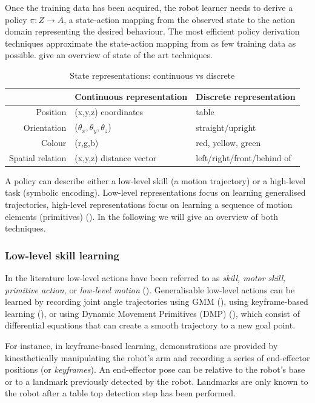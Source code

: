 Once the training data has been acquired, the robot learner needs to derive a policy $\pi : Z \rightarrow A$, a state-action mapping from the observed state to the action domain representing the desired behaviour.
The most efficient policy derivation techniques approximate the state-action mapping from as few training data as possible.
\cite{chernova2014robot} give an overview of state of the art techniques.

\begin{table}[ht]
	\centering
	\caption{State representations: continuous vs discrete}
	\label{tab:representations}
	\begin{tabular}{r|ll}
		& Continuous representation & Discrete representation\\ \hline
		Position & (x,y,z) coordinates & table \\
		Orientation & ($\theta_x,\theta_y,\theta_z$) & straight/upright \\
		Colour & (r,g,b) & red, yellow, green\\
		Spatial relation & (x,y,z) distance vector & left/right/front/behind of 
	\end{tabular}
\end{table}

A policy can describe either a low-level skill (\ie a motion trajectory) or a high-level task (\ie symbolic encoding).
Low-level representations focus on learning generalised trajectories, high-level representations focus on learning a sequence of motion elements (primitives) (\cite{peppoloni2014ros}). 
In the following we will give an overview of both techniques.

\subsubsection{Low-level skill learning}
In the literature low-level actions have been referred to as \textit{skill, motor skill, primitive action,} or \textit{low-level motion} (\cite{chernova2014robot}).
Generalisable low-level actions can be learned by recording joint angle trajectories using GMM (\cite{billard2008robot}), using keyframe-based learning (\cite{akgun2012keyframe}), or using Dynamic Movement Primitives (DMP) (\cite{pastor2009learning}), which consist of differential equations that can create a smooth trajectory to a new goal point.

For instance, in keyframe-based learning, demonstrations are provided by kinesthetically manipulating the robot's arm and recording a series of end-effector positions (or \textit{keyframes}). 
An end-effector pose can be relative to the robot's base or to a landmark previously detected by the robot.
Landmarks are only known to the robot after a table top detection step has been performed.

